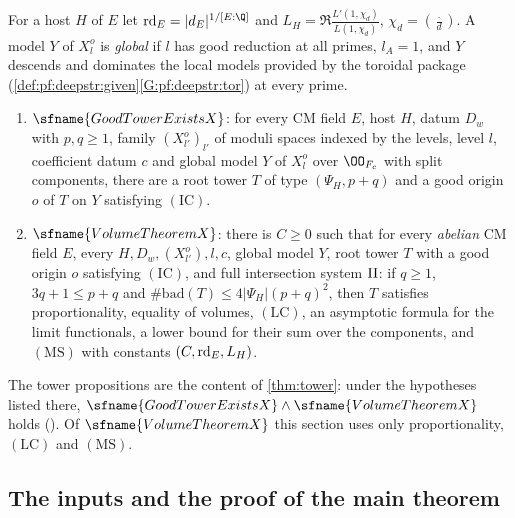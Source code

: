\begin{definition}\label{def:pf:deepstr:towerstatements}
For a host $H$ of $E$ let $\deepstrrd_E=|d_E|^{1/[E:\Q]}$ and $L_H=\Re\frac{L'(1,\chi_d)}{L(1,\chi_d)}$,
$\chi_d=(\frac{\cdot}{d})$. A model $Y$ of $X^o_l$ is \emph{global} if $l$ has good reduction at all primes,
$l_A=1$, and $Y$ descends and dominates the local models provided by the toroidal package
(\cref{def:pf:deepstr:given}\ref{G:pf:deepstr:tor}) at every prime.
\begin{enumerate}[label=(\alph*)]
\item $\sfname{GoodTowerExistsX}$: for every CM field $E$, host $H$, datum $D_w$ with $p,q\ge1$, family
$(X^o_{l'})_{l'}$ of moduli spaces indexed by the levels, level $l$, coefficient datum $c$ and global model
$Y$ of $X^o_l$ over $\OO_{F_c}$ with split components, there are a root tower $T$ of type $(\Psi_H,p+q)$ and a
good origin $o$ of $T$ on $Y$ satisfying $\mathrm{(IC)}$.
\item $\sfname{VolumeTheoremX}$: there is $C\ge0$ such that for every \emph{abelian} CM field $E$, every
$H,D_w,(X^o_{l'}),l,c$, global model $Y$, root tower $T$ with a good origin $o$ satisfying $\mathrm{(IC)}$, and
full intersection system $\mathrm{II}$: if $q\ge1$, $3q+1\le p+q$ and $\#\mathrm{bad}(T)\le4|\Psi_H|(p+q)^2$,
then $T$ satisfies proportionality, equality of volumes, $\mathrm{(LC)}$, an asymptotic formula for the limit
functionals, a lower bound for their sum over the components, and $\mathrm{(MS)}$ with constants
$(C,\operatorname{rd}_E,L_H)$.
\end{enumerate}
\end{definition}

The tower propositions are the content of \cref{thm:tower}: under the hypotheses listed there,
$\sfname{GoodTowerExistsX}\wedge\sfname{VolumeTheoremX}$ holds
(). Of
$\sfname{VolumeTheoremX}$ this section uses only proportionality, $\mathrm{(LC)}$ and $\mathrm{(MS)}$.

\subsection{The inputs and the proof of the main theorem}\label{sec:pf:deepstr:inputs}


